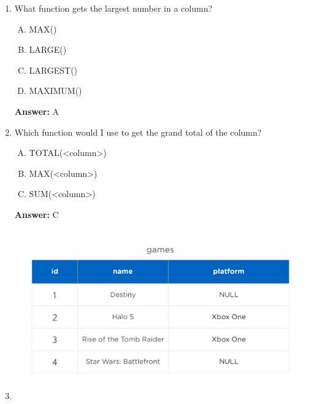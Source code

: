 \documentclass[12pt]{article}
\begin{document}
\begin{enumerate}[1.]
    \item

    What function gets the largest number in a column?

    \bigskip

    \begin{enumerate}[A.]
        \item MAX()
        \item LARGE()
        \item LARGEST()
        \item MAXIMUM()
    \end{enumerate}

    \bigskip

    \textbf{Answer:} A

    \item

    Which function would I use to get the grand total of the column?

    \bigskip

    \begin{enumerate}[A.]
        \item TOTAL(<column>)
        \item MAX(<column>)
        \item SUM(<column>)
    \end{enumerate}

    \bigskip

    \textbf{Answer:} C

    \item
    \begin{center}
    \includegraphics[width=\linewidth]{images/part_3_notes_5.png}
    \end{center}

    \bigskip


\end{enumerate}
\end{document}
